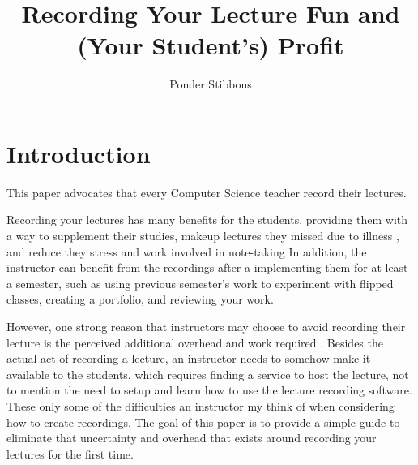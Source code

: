 \documentclass[sigconf]{acmart}
\title{Recording Your Lecture Fun and (Your Student's) Profit}
\author{Ponder Stibbons}
\affiliation{\institution{Unseen University}}
\begin{document}
\maketitle



\section{Introduction}


This paper advocates that every Computer Science teacher record their lectures.

Recording your lectures has many benefits for the students, providing them with a way to supplement their studies, makeup lectures they missed due to illness \cite{traphagan2010impact}, and reduce they stress and work involved in note-taking
In addition, the instructor can benefit from the recordings after a implementing them for at least a semester, such as using previous semester's work to experiment with flipped classes, creating a portfolio, and reviewing your work. 

However, one strong reason that instructors may choose to avoid recording their lecture is the perceived additional overhead and work required \cite{maynor2013student}.
Besides the actual act of recording a lecture, an instructor needs to somehow make it available to the students, which requires finding a service to host the lecture, not to mention the need to setup and learn how to use the lecture recording software.
These only some of the difficulties an instructor my think of when considering how to create recordings.
The goal of this paper is to provide a simple guide to eliminate that uncertainty and overhead that exists around recording your lectures for the first time.




\end{document}
